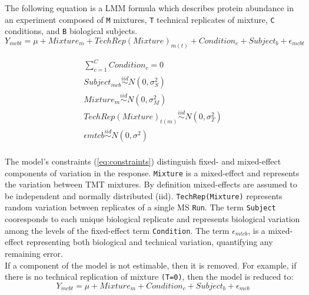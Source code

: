\documentclass[12pt]{elife}\usepackage[]{graphicx}\usepackage[]{color}
\begin{document}
The following equation is a LMM formula which describes protein abundance in an
experiment composed of  \texttt{M} mixtures, \texttt{T} technical replicates of
mixture, \texttt{C} conditions, and \texttt{B} biological subjects.\\

\begin{equation} %
	\label{eq:full} 	Y_{mcbt} = \mu + Mixture_m + TechRep(Mixture)_{m(t)} + Condition_c + 
	Subject_b + \epsilon_{mcbt}
\end{equation}

\begin{equation} %
  \begin{gathered}
	\label{eq:constraints}  
	\sum_{c=1}^{C} Condition_c = 0 \\
	Subject_{mcb} \stackrel{iid}{\sim} N(0,\sigma^2_S) \\
	Mixture_m \stackrel{iid}{\sim} N(0,\sigma^2_M) \\
	TechRep(Mixture)_{t(m)} \stackrel{iid}{\sim} N(0,\sigma^2_T) \\
	\epsilon{mtcb} \stackrel{iid}{\sim} N(0,\sigma^2) \\
  \end{gathered}
\end{equation}

The model's constraints (\ref{eq:constraints}) distinguish fixed- and
mixed-effect components of variation in the response. \texttt{Mixture} is a
mixed-effect and represents the variation between TMT mixtures. By definition
mixed-effects are assumed to be independent and normally distributed (iid).
\texttt{TechRep(Mixture)} represents random variation between replicates of a
single MS \texttt{Run}.  The term \texttt{Subject} cooresponds to each unique
biological replicate and represents biological variation among the levels of the
fixed-effect term \texttt{Condition}. The term $\epsilon_{mtcb}$, is a
mixed-effect representing both biological and technical variation, quantifying
any remaining error.\\

If a component of the model is not estimable, then it is removed. 
For example, if there is no technical replication of mixture \texttt{(T=0)}, 
then the model is reduced to: \\

\begin{equation}
	\label{eq:reduced} %
	Y_{mcbt} = \mu + Mixture_m + Condition_c + Subject_b + \epsilon_{mcb}
\end{equation}
\end{document}
